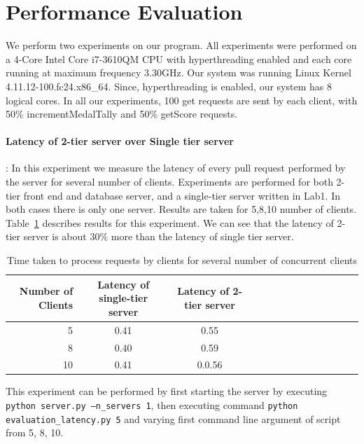 \documentclass{article}
\begin{document}
\section{Performance Evaluation}
We perform two experiments on our program. All experiments were performed
on a 4-Core Intel Core i7-3610QM CPU with hyperthreading enabled and each core
running at maximum frequency 3.30GHz. Our system was running Linux Kernel 
4.11.12-100.fc24.x86\_64. Since, hyperthreading is enabled, our system has 
8 logical cores. In all our experiments, 100 get requests are sent by
each client, with 50\% incrementMedalTally and 50\% getScore requests.

\paragraph{Latency of 2-tier server over Single tier server}:
In this experiment we measure the latency of every pull request 
performed by the server for several number of clients. Experiments are performed
for both 2-tier front end and database server, and a single-tier server written
in Lab1. In both cases there is only one server. 
Results are taken for 5,8,10 number of clients.
Table~\ref{tab:pull-request-latency} describes results for this experiment.
We can see that the latency of 2-tier server is about 30\% more than the 
latency of single tier server.

\begin{table}
    \small
\begin{tabularx}{\linewidth}{rccccccccccccc}
\toprule
Number of Clients&Latency of single-tier server&Latency of 2-tier server\\
\midrule
5&0.41&0.55&\\
8&0.40&0.59&\\
10&0.41&0.0.56&\\
\bottomrule
\end{tabularx}
\caption{Time taken to process requests by clients for several number of concurrent clients}
\label{tab:pull-request-latency}
\end{table}

This experiment can be performed by first starting the server by executing
{\tt python server.py --n\_servers 1}, then
executing command {\tt python evaluation\_latency.py 5}
and varying first command line argument of script from 5, 8, 10.
\end{document}
